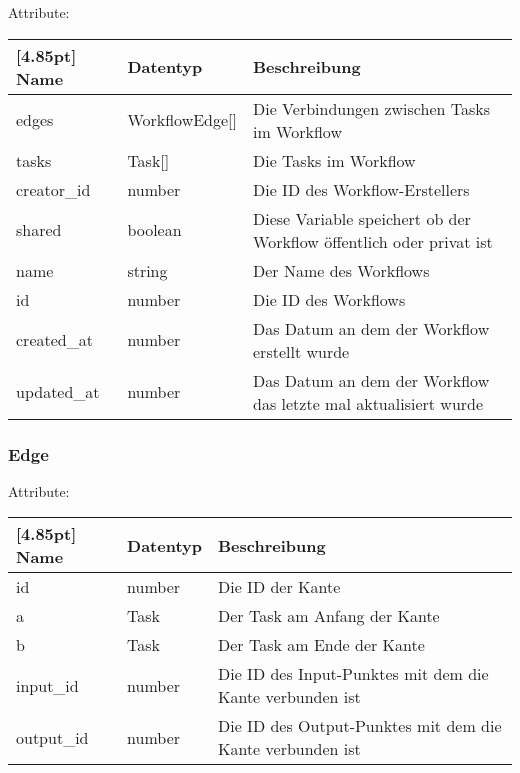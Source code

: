     		Attribute:
            \begin{center}
            	\renewcommand{\arraystretch}{1.5}
                \setlength\tabcolsep{5pt}
            	\begin{tabularx}{\textwidth}{|l|l|X|}
            		\hline
                    \rowcolor[gray]{0.75}[4.85pt]            		
                    Name & Datentyp & Beschreibung \\ \hline
                    edges & WorkflowEdge[] & Die Verbindungen zwischen Tasks im Workflow \\ \hline
                    tasks & Task[] & Die Tasks im Workflow \\ \hline
                    creator_id & number & Die ID des Workflow-Erstellers \\ \hline
                    shared & boolean & Diese Variable speichert ob der Workflow öffentlich oder privat ist \\ \hline
                    name & string & Der Name des Workflows \\ \hline
                    id & number & Die ID des Workflows \\ \hline
                    created_at & number & Das Datum an dem der Workflow erstellt wurde \\ \hline
                    updated_at & number & Das Datum an dem der Workflow das letzte mal aktualisiert wurde \\ \hline
            	\end{tabularx}
            \end{center}
                
            \subsubsection{Edge}
    		
    		Attribute:
            \begin{center}
            	\renewcommand{\arraystretch}{1.5}
                \setlength\tabcolsep{5pt}
            	\begin{tabularx}{\textwidth}{|l|l|X|}
            		\hline
                    \rowcolor[gray]{0.75}[4.85pt]            		
                    Name & Datentyp & Beschreibung \\ \hline
                     id & number & Die ID der Kante \\ \hline
                     a & Task & Der Task am Anfang der Kante \\ \hline
                     b & Task & Der Task am Ende der Kante \\ \hline
                     input_id & number & Die ID des Input-Punktes mit dem die Kante verbunden ist \\ \hline
                     output_id & number & Die ID des Output-Punktes mit dem die Kante verbunden ist \\ \hline
            	\end{tabularx}
            \end{center}
            
